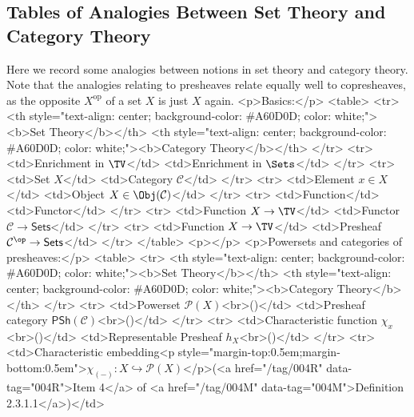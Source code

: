 \subsection{Tables of Analogies Between Set Theory and Category Theory}\label{subsection-table-of-analogies-between-set-theory-and-category-theory}
Here we record some analogies between notions in set theory and category theory. Note that the analogies relating to presheaves relate equally well to copresheaves, as the opposite $X^{\mathrm{op}}$ of a set $X$ is just $X$ again.
<p>Basics:</p>
<table>
  <tr>
    <th style="text-align: center; background-color: #A60D0D; color: white;"><b>Set Theory</b></th>
    <th style="text-align: center; background-color: #A60D0D; color: white;"><b>Category Theory</b></th>
  </tr>
  <tr>
    <td>Enrichment in $\TV$</td>
    <td>Enrichment in $\Sets$</td>
  </tr>
  <tr>
    <td>Set $X$</td>
    <td>Category $\mathcal{C}$</td>
  </tr>
  <tr>
    <td>Element $x\in X$</td>
    <td>Object $X\in\Obj(\mathcal{C})$</td>
  </tr>
  <tr>
    <td>Function</td>
    <td>Functor</td>
  </tr>
  <tr>
    <td>Function $X\to\TV$</td>
    <td>Functor $\mathcal{C}\to\mathsf{Sets}$</td>
  </tr>
  <tr>
    <td>Function $X\to\TV$</td>
    <td>Presheaf $\mathcal{C}^{\op}\to\mathsf{Sets}$</td>
  </tr>
</table>
<p></p>
<p>Powersets and categories of presheaves:</p>
<table>
  <tr>
    <th style="text-align: center; background-color: #A60D0D; color: white;"><b>Set Theory</b></th>
    <th style="text-align: center; background-color: #A60D0D; color: white;"><b>Category Theory</b></th>
  </tr>
  <tr>
    <td>Powerset $\mathcal{P}(X)$<br>()</td>
    <td>Presheaf category $\mathsf{PSh}(\mathcal{C})$<br>()</td>
  </tr>
  <tr>
    <td>Characteristic function $\chi_{x}$<br>()</td>
    <td>Representable Presheaf $h_{X}$<br>()</td>
  </tr>
  <tr>
    <td>Characteristic embedding<p style="margin-top:0.5em;margin-bottom:0.5em">$\chi_{(-)}\colon X\hookrightarrow\mathcal{P}(X)$</p>(<a href="/tag/004R" data-tag="004R">Item 4</a> of <a href="/tag/004M" data-tag="004M">Definition 2.3.1.1</a>)</td>
